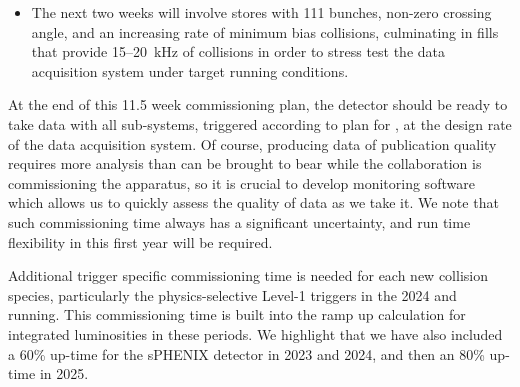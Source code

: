 \begin{itemize}
\item The next two weeks will involve stores with 111 bunches,
  non-zero crossing angle, and an increasing rate of minimum bias
  collisions, culminating in fills that provide 15--20~kHz of
  collisions in order to stress test the data acquisition system under
  target running conditions.

\end{itemize}

At the end of this 11.5 week commissioning plan, the detector should be
ready to take data with all sub-systems, triggered according to plan for
\auau, at the design rate of the data acquisition system.  Of course,
producing data of publication quality requires more analysis than can
be brought to bear while the collaboration is commissioning the
apparatus, so it is crucial to develop monitoring software which
allows us to quickly assess the quality of data as we take it.  We
note that such commissioning time always has a significant uncertainty,
and run time flexibility in this first year will be
required.

Additional trigger specific commissioning time is needed for each new
collision species, particularly the physics-selective Level-1 triggers
in the 2024 \pp and \pau running.  This commissioning time is built
into the ramp up calculation for integrated luminosities in these
periods.  We highlight that we have also included a 60\% up-time for
the sPHENIX detector in 2023 and 2024, and then an 80\% up-time in
2025.

